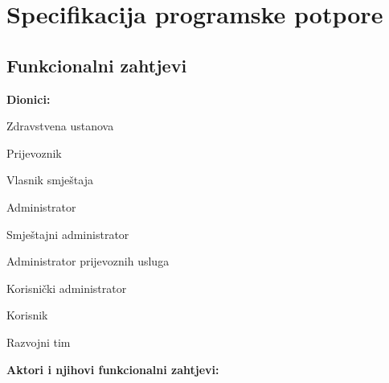 \chapter{Specifikacija programske potpore}
		
	\section{Funkcionalni zahtjevi}
			
			
				
			
			
			\noindent \textbf{Dionici:}
			
			\begin{packed_enum}
				
				\item Zdravstvena ustanova
				\item Prijevoznik			
				\item Vlasnik smještaja
				\item Administrator
				\begin{packed_enum}
					\item Smještajni administrator
					\item Administrator prijevoznih usluga
					\item Korisnički administrator
				\end{packed_enum}
				\item Korisnik
				\item Razvojni tim
				
			\end{packed_enum}
			\pagebreak
			
			\noindent \textbf{Aktori i njihovi funkcionalni zahtjevi:}
			
